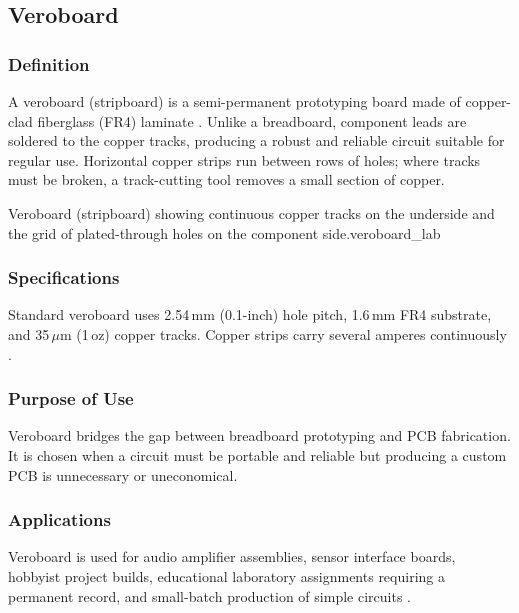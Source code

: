 \subsection{Veroboard}

\subsubsection*{Definition}
A veroboard (stripboard) is a semi-permanent prototyping board made of copper-clad
fiberglass (FR4) laminate \cite{wiki:breadboard}. Unlike a breadboard, component leads
are soldered to the copper tracks, producing a robust and reliable circuit suitable for
regular use. Horizontal copper strips run between rows of holes; where tracks must be
broken, a track-cutting tool removes a small section of copper.

%
  {Veroboard (stripboard) showing continuous copper tracks on the
   underside and the grid of plated-through holes on the component side.}{veroboard_lab}

\subsubsection*{Specifications}
Standard veroboard uses 2.54\,mm (0.1-inch) hole pitch, 1.6\,mm FR4 substrate, and
35\,$\mu$m (1\,oz) copper tracks. Copper strips carry several amperes continuously
\cite{analog:breadboard}.

\subsubsection*{Purpose of Use}
Veroboard bridges the gap between breadboard prototyping and PCB fabrication. It is
chosen when a circuit must be portable and reliable but producing a custom PCB is
unnecessary or uneconomical.

\subsubsection*{Applications}
Veroboard is used for audio amplifier assemblies, sensor interface boards, hobbyist
project builds, educational laboratory assignments requiring a permanent record, and
small-batch production of simple circuits \cite{boylestad2015}.

